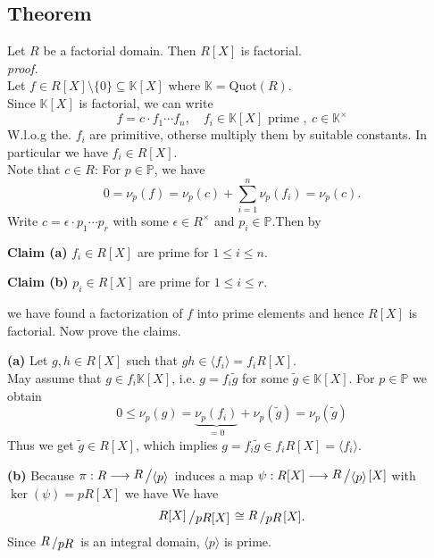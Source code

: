 \documentclass[12pt]{book}
\newcommand{\slant}[2]{{\raisebox{.1em}{$#1$}\left/\raisebox{-.1em}{$#2$}\right.}}
\begin{document}
\begin{spacing}{1.3}
\subsection{Theorem} %
\titleformat{\subsection}{\normalfont\normalsize\bfseries}{}{0em}{#1 \thesubsection}
Let $R$ be a factorial domain. Then $R[X]$ is factorial.\\
\textit{proof.}\\
Let $f \in R[X]\setminus \{0\} \subseteq \mathbb{K}[X]$ where $\mathbb{K}=\textrm{Quot}(R)$.\\
Since $\mathbb{K}[X]$ is factorial, we can write
$$f=c \cdot f_1 \cdots f_n, \quad f_i \in \mathbb{K}[X] \textrm{ prime }, \ c \in \mathbb{K}^{\times}$$
W.l.o.g the. $f_i$ are primitive, otherse multiply them by suitable constants. In particular we have $f_i \in R[X]$.\\
Note that $c \in R$: For $p \in \mathbb{P}$, we have $$0=\nu_p(f)=\nu_p(c)+ \sum_{i=1}^n \nu_p(f_i)=\nu_p(c).$$
Write $c= \epsilon \cdot p_1 \cdots p_r$ with some $\epsilon \in R^{\times}$ and $p_i \in \mathbb{P}$.Then by
\begin{compactenum}
\item[\textbf{Claim (a)}] $f_i \in R[X]$ are prime for $1 \leqslant i \leqslant n$.
\item[\textbf{Claim (b)}] $p_i \in R[X]$ are prime for $1 \leqslant i \leqslant r$.
\end{compactenum}
we have found a factorization of $f$ into prime elements and hence $R[X]$ is factorial. Now prove the claims.
\begin{compactenum}
\item[\textbf{(a)}] Let $g,h \in R[X]$ such that $gh \in \langle f_i \rangle=f_i R[X]$.\\
May assume that $g \in f_i\mathbb{K}[X]$, i.e. $g=f_i \tilde{g}$ for some $\tilde{g} \in \mathbb{K}[X]$. For $p \in \mathbb{P}$ we obtain
$$0 \leqslant \nu_p(g)=\underbrace{\nu_p(f_i)}_{=0}+\nu_p(\tilde{g})=\nu_p(\tilde{g})$$
Thus we get $\tilde{g} \in R[X]$, which implies $g=f_i \tilde{g} \in f_i R[X]=\langle f_i \rangle$.
\item[\textbf{(b)}] Because $\pi:R \longrightarrow \slant{R}{\langle p \rangle}$ induces a map $\psi: R[X] \longrightarrow \slant{R}{\langle p \rangle}[X]$ with $\ker(\psi)=pR[X]$ we have
We have $$\slant{R[X]}{p R[X]} \cong \slant{R}{pR}[X].$$
Since $\slant{R}{pR}$ is an integral domain, $\langle p \rangle$ is prime.
\end{compactenum}


\end{spacing}
\end{document}
